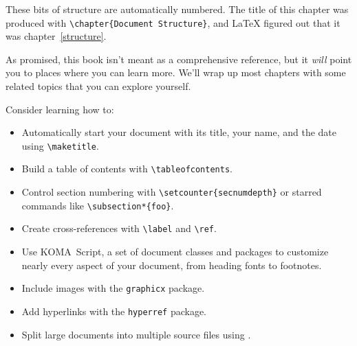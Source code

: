 These bits of structure are automatically numbered.
The title of this chapter was produced with \verb|\chapter{Document Structure}|,
and \LaTeX{} figured out that it was chapter~\ref{structure}.

\exercises{}

As promised, this book isn't meant as a comprehensive reference,
but it \emph{will} point you to places where you can learn more.
We'll wrap up most chapters with some related topics that you can
explore yourself.

Consider learning how to:
\begin{itemize}
\item Automatically start your document with its title, your name,
    and the date using \verb|\maketitle|.
\item Build a table of contents
    with \verb|\tableofcontents|.
\item Control section numbering with \verb|\setcounter{secnumdepth}|
or starred commands like \verb|\subsection*{foo}|.
\item Create cross-references with \verb|\label| and \verb|\ref|.
\item Use KOMA~Script, a set of document classes and packages
to customize nearly every aspect of your document,
from heading fonts to footnotes.
\item Include images with the \texttt{graphicx} package.
\item Add hyperlinks with the \texttt{hyperref} package.
\item Split large documents into multiple source files using \verb||.
\end{itemize}
